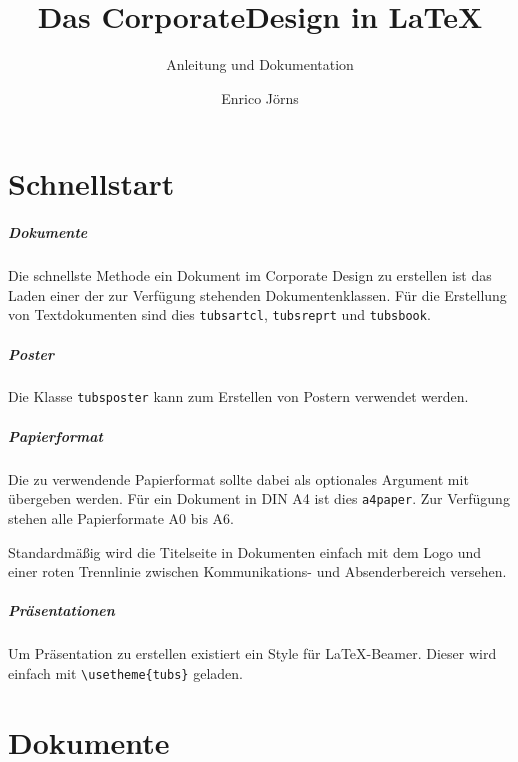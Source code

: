 \documentclass[a4paper,11pt]{tubsreprt}
\title{Das CorporateDesign in \LaTeX}
\subtitle{Anleitung und Dokumentation}
\author{Enrico Jörns}
\begin{document}
\maketitle
\pagestyle{scrheadings}
\tableofcontents


\newcommand{\newdocumentclass}[1]{\textcolor{tuRed}{\lstinline{#1}}}

\chapter{Schnellstart}

\paragraph{Dokumente}
Die schnellste Methode ein Dokument im Corporate Design zu erstellen ist
das Laden einer der zur Verfügung stehenden Dokumentenklassen.
Für die Erstellung von Textdokumenten sind dies \newdocumentclass{tubsartcl},
\newdocumentclass{tubsreprt} und \newdocumentclass{tubsbook}.

\paragraph{Poster}
Die Klasse \newdocumentclass{tubsposter} kann zum Erstellen von Postern verwendet werden.

\paragraph{Papierformat}
Die zu verwendende Papierformat sollte dabei als optionales Argument mit
übergeben werden. Für ein Dokument in DIN A4 ist dies \texttt{a4paper}.
Zur Verfügung stehen alle Papierformate A0 bis A6.

Standardmäßig wird die Titelseite in Dokumenten einfach mit dem Logo und einer
roten Trennlinie zwischen Kommunikations- und Absenderbereich versehen.

\paragraph{Präsentationen}
Um Präsentation zu erstellen existiert ein Style für \LaTeX-Beamer.
Dieser wird einfach mit \lstinline!\usetheme{tubs}! geladen.


\chapter{Dokumente}
\end{document}
